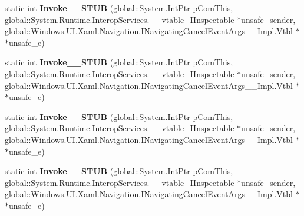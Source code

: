 \begin{DoxyCompactItemize}
\item 
\mbox{\label{struct_windows_1_1_u_i_1_1_xaml_1_1_navigation_1_1_navigating_cancel_event_handler_____impl_1_1_vtbl_a8330e0c5a30953c1360d72cd3972521c}} 
static int {\bfseries Invoke\+\_\+\+\_\+\+S\+T\+UB} (global\+::\+System.\+Int\+Ptr p\+Com\+This, global\+::\+System.\+Runtime.\+Interop\+Services.\+\_\+\+\_\+vtable\+\_\+\+I\+Inspectable $\ast$unsafe\+\_\+sender, global\+::\+Windows.\+U\+I.\+Xaml.\+Navigation.\+I\+Navigating\+Cancel\+Event\+Args\+\_\+\+\_\+\+Impl.\+Vtbl $\ast$$\ast$unsafe\+\_\+e)
\item 
\mbox{\label{struct_windows_1_1_u_i_1_1_xaml_1_1_navigation_1_1_navigating_cancel_event_handler_____impl_1_1_vtbl_a8330e0c5a30953c1360d72cd3972521c}} 
static int {\bfseries Invoke\+\_\+\+\_\+\+S\+T\+UB} (global\+::\+System.\+Int\+Ptr p\+Com\+This, global\+::\+System.\+Runtime.\+Interop\+Services.\+\_\+\+\_\+vtable\+\_\+\+I\+Inspectable $\ast$unsafe\+\_\+sender, global\+::\+Windows.\+U\+I.\+Xaml.\+Navigation.\+I\+Navigating\+Cancel\+Event\+Args\+\_\+\+\_\+\+Impl.\+Vtbl $\ast$$\ast$unsafe\+\_\+e)
\item 
\mbox{\label{struct_windows_1_1_u_i_1_1_xaml_1_1_navigation_1_1_navigating_cancel_event_handler_____impl_1_1_vtbl_a8330e0c5a30953c1360d72cd3972521c}} 
static int {\bfseries Invoke\+\_\+\+\_\+\+S\+T\+UB} (global\+::\+System.\+Int\+Ptr p\+Com\+This, global\+::\+System.\+Runtime.\+Interop\+Services.\+\_\+\+\_\+vtable\+\_\+\+I\+Inspectable $\ast$unsafe\+\_\+sender, global\+::\+Windows.\+U\+I.\+Xaml.\+Navigation.\+I\+Navigating\+Cancel\+Event\+Args\+\_\+\+\_\+\+Impl.\+Vtbl $\ast$$\ast$unsafe\+\_\+e)
\item 
\mbox{\label{struct_windows_1_1_u_i_1_1_xaml_1_1_navigation_1_1_navigating_cancel_event_handler_____impl_1_1_vtbl_a8330e0c5a30953c1360d72cd3972521c}} 
static int {\bfseries Invoke\+\_\+\+\_\+\+S\+T\+UB} (global\+::\+System.\+Int\+Ptr p\+Com\+This, global\+::\+System.\+Runtime.\+Interop\+Services.\+\_\+\+\_\+vtable\+\_\+\+I\+Inspectable $\ast$unsafe\+\_\+sender, global\+::\+Windows.\+U\+I.\+Xaml.\+Navigation.\+I\+Navigating\+Cancel\+Event\+Args\+\_\+\+\_\+\+Impl.\+Vtbl $\ast$$\ast$unsafe\+\_\+e)

\end{DoxyCompactItemize}
